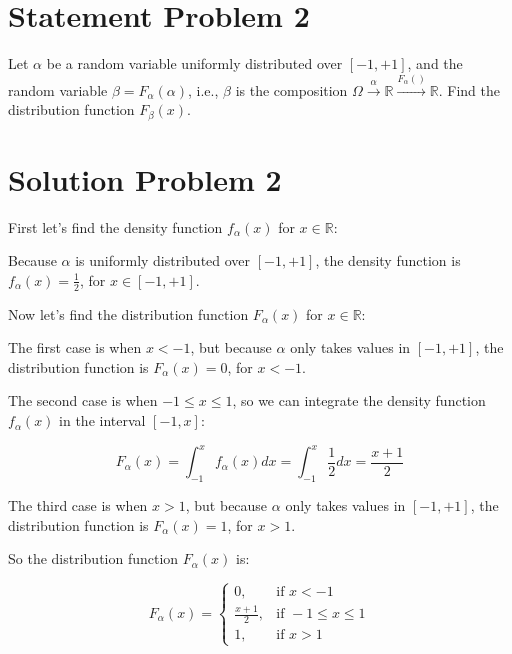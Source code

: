 \section*{Statement Problem 2}

Let $\alpha$ be a random variable uniformly distributed over $[-1, +1]$, and the
random variable $\beta = F_{\alpha}(\alpha)$, i.e., $\beta$ is the
composition $\Omega \overset{\alpha}{\rightarrow} \mathbb{R} \overset{F_{\alpha}()}{\rightarrow} \mathbb{R}$.
Find the distribution function $F_{\beta}(x)$.

\section*{Solution Problem 2}

First let's find the density function $f_{\alpha}(x)$ for $x \in \mathbb{R}$:

Because $\alpha$ is uniformly distributed over $[-1, +1]$, the density function
is $f_{\alpha}(x) = \frac{1}{2}$, for $x \in [-1, +1]$.

Now let's find the distribution function $F_{\alpha}(x)$ for $x \in \mathbb{R}$:

The first case is when $x < -1$, but because $\alpha$ only takes values in
$[-1, +1]$, the distribution function is $F_{\alpha}(x) = 0$, for $x < -1$.

The second case is when $-1 \leq x \leq 1$, so we can integrate the density function
$f_{\alpha}(x)$ in the interval $[-1, x]$:

\begin{equation}
    F_{\alpha}(x) = \int_{-1}^{x} f_{\alpha}(x) dx = \int_{-1}^{x} \frac{1}{2} dx = \frac{x + 1}{2}
\end{equation}

The third case is when $x > 1$, but because $\alpha$ only takes values in
$[-1, +1]$, the distribution function is $F_{\alpha}(x) = 1$, for $x > 1$.

So the distribution function $F_{\alpha}(x)$ is:

\begin{equation}
    F_{\alpha}(x) = \begin{cases}
        0,               & \text{if } x < -1           \\
        \frac{x + 1}{2}, & \text{if } -1 \leq x \leq 1 \\
        1,               & \text{if } x > 1
    \end{cases}
\end{equation}

